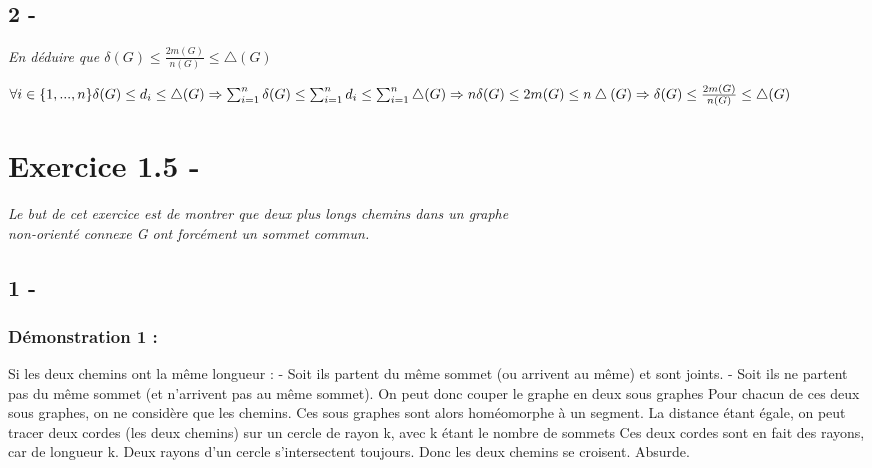 \documentclass{article}
\begin{document}
    \subsection*{2 -}
            \textit{En déduire que $\delta(G) \leq \frac{2m(G)}{n(G)} \leq \bigtriangleup(G)$}\\
            \begin{center}
            $
            \forall i \in \{1,...,n\} \delta(G) \leq d_{i} \leq \bigtriangleup(G)
            \linebreak
            \Rightarrow \sum_{i=1}^{n} \delta(G) \leq \sum_{i=1}^{n} d_{i} \leq \sum_{i=1}^{n} \bigtriangleup(G)
            \linebreak
            \Rightarrow n \delta(G) \leq 2m(G) \leq n\bigtriangleup(G)
            \linebreak
            \Rightarrow  \delta(G) \leq \frac{2m(G)}{n(G)} \leq \bigtriangleup(G)
            $
            \end{center}
\section*{Exercice 1.5 -}
\textit{Le but de cet exercice est de montrer que deux plus longs chemins dans un graphe\\ non-orienté connexe G ont forcément un sommet commun.}
    \subsection*{1 -}
            \subsubsection*{Démonstration 1 :}
            \textrm{Si les deux chemins ont la même longueur :}
            \linebreak
            \textrm{- Soit ils partent du même sommet (ou arrivent au même) et sont joints.}
            \linebreak
            \textrm{- Soit ils ne partent pas du même sommet (et n'arrivent pas au même sommet).}
            \linebreak
            \textrm{On peut donc couper le graphe en deux sous graphes}
            \linebreak
            \textrm{Pour chacun de ces deux sous graphes, on ne considère que les chemins.}
            \linebreak
            \textrm{Ces sous graphes sont alors homéomorphe à un segment.}
            \linebreak
            \textrm{La distance étant égale, on peut tracer deux cordes}
            \linebreak
            \textrm{(les deux chemins) sur un cercle de rayon k, avec k étant le nombre de sommets}
            \linebreak
            \textrm{Ces deux cordes sont en fait des rayons, car de longueur k.}
            \linebreak
            \textrm{Deux rayons d'un cercle s'intersectent toujours.}
            \linebreak
            \textrm{Donc les deux chemins se croisent. Absurde.}
\end{document}
